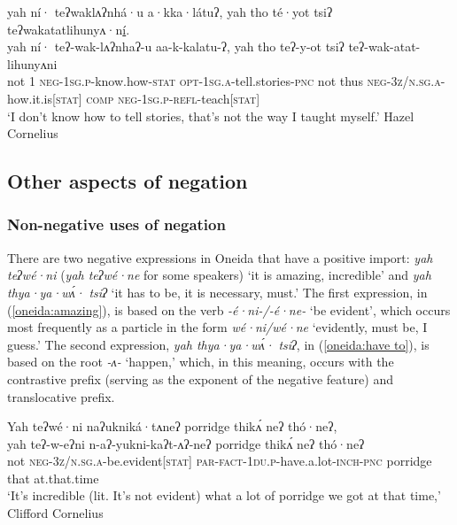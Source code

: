 \documentclass[output=paper,colorlinks,citecolor=brown]{langscibook}
\begin{document}
\ea\label{oneida:double 4}
	\glll yah ní· teʔwaklʌʔnhá·u a·kka·látuʔ, yah tho té·yot tsiʔ teʔwakatatlihunyʌ·n\uline{í}.	\\
	yah ní· teʔ-wak-lʌʔnhaʔ-u aa-k-kalatu-ʔ, yah tho teʔ-y-ot 	tsiʔ teʔ-wak-atat-lihunyʌni	\\
	not \textsc{1} \textsc{neg-1sg.p}-know.how-\textsc{stat} \textsc{opt-1sg.a}-tell.stories-\textsc{pnc} not thus \textsc{neg-3z/n.sg.a}-how.it.is[\textsc{stat}] \textsc{comp} \textsc{neg-1sg.p-refl}-teach[\textsc{stat}] \\
	\glt `I don't know how to tell stories, that's not the way I taught myself.' Hazel Cornelius \citep[181 (15)]{MichelsonEtAl2016}
\z

\subsection{Other aspects of negation}
\label{oneida:sec:more}

\subsubsection{Non-negative uses of negation}
\label{oneida:sec:non-neg uses}

There are two negative expressions in Oneida that have a positive import: \textit{yah teʔwé·ni} (\textit{yah teʔwé·ne} for some speakers) `it is amazing, incredible' and \textit{yah thya·ya·wʌ́· tsiʔ} `it has to be, it is necessary, must.' The first expression, in (\ref{oneida:amazing}), is  based on the verb \textit{-é·ni-/-é·ne-} `be evident', which occurs most frequently as a particle in the form \textit{wé·ni/wé·ne} `evidently, must be, I guess.' The second expression, \textit{yah thya·ya·wʌ́· tsiʔ}, in  (\ref{oneida:have to}), is based on the root \textit{-ʌ-} `happen,' which, in this meaning, occurs with the contrastive prefix (serving as the exponent of the negative feature) and translocative prefix. 

\ea\label{oneida:amazing}
    \glll Yah teʔwé·ni naʔukniká·tʌneʔ
    porridge thikʌ́ {neʔ thó·neʔ}, \\
    yah teʔ-w-eʔni n-aʔ-yukni-kaʔt-ʌʔ-neʔ
    porridge thikʌ́ {neʔ thó·neʔ}  \\
    not \textsc{neg-3z/n.sg.a}-be.evident[\textsc{stat}] \textsc{par-fact-1du.p}-have.a.lot-\textsc{inch-pnc} porridge that {at.that.time} \\
    \glt `It's incredible (lit. It's not evident) what a lot of porridge we got at that time,' Clifford Cornelius \citep[223 (37)]{MichelsonEtAl2016} %
\z
\end{document}
